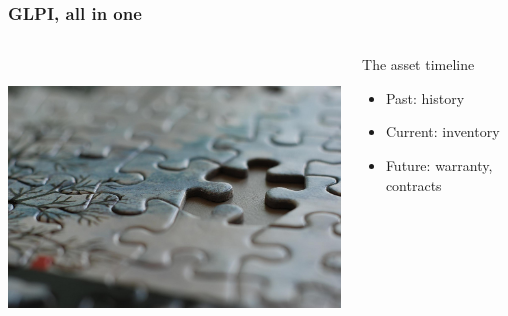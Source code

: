 \documentclass{beamer}
\begin{document}
\begin{frame}


    \frametitle{GLPI, all in one}
 \begin{columns}
 \begin{column}{0.45\textwidth}
         \includegraphics[height=7.5cm]{./pics/glpithelink.jpg}
 \end{column}
 \begin{column}{0.65\textwidth}
    \begin{block}{The asset timeline}
        \begin{itemize}
            \item Past: history
            \item Current: inventory
            \item Future: warranty, contracts
        \end{itemize}

    \end{block}

 \end{column}
\end{columns}
\end{frame}
\end{document}
